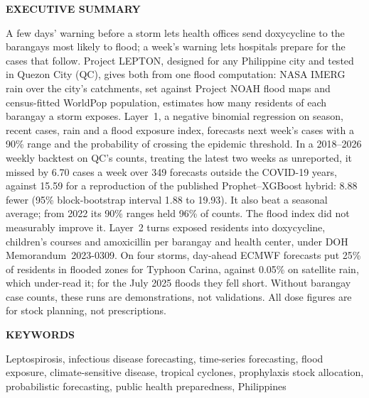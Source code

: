 \begin{leptonsummary}
{\color{leptonnavy}\large\bfseries EXECUTIVE SUMMARY\par}
\vspace{1mm}
A few days' warning before a storm lets health offices send doxycycline to the barangays most
likely to flood; a week's warning lets hospitals prepare for the cases that follow. Project
LEPTON, designed for any Philippine city and tested in Quezon City (QC), gives both from one
flood computation: NASA IMERG rain over the city's catchments, set against Project NOAH flood
maps and census-fitted WorldPop population, estimates how many residents of each barangay a
storm exposes. Layer~1, a negative binomial regression on season, recent cases, rain and a flood
exposure index, forecasts next week's cases with a 90\% range and the probability of crossing
the epidemic threshold. In a 2018--2026 weekly backtest on QC's counts, treating the latest two
weeks as unreported, it missed by 6.70 cases a week over 349 forecasts outside the COVID-19
years, against 15.59 for a reproduction of the published Prophet--XGBoost hybrid: 8.88 fewer
(95\% block-bootstrap interval 1.88 to 19.93). It also beat a seasonal average; from 2022 its
90\% ranges held 96\% of counts. The
flood index did not measurably improve it. Layer~2 turns exposed residents into doxycycline,
children's courses and amoxicillin per barangay and health center, under DOH
Memorandum~\mbox{2023-0309}. On four storms, day-ahead ECMWF forecasts put 25\% of residents in
flooded zones for Typhoon Carina, against 0.05\% on satellite rain, which under-read it; for the
July 2025 floods they fell short. Without barangay case counts, these runs are demonstrations,
not validations. All dose figures are for stock planning, not prescriptions.

\vspace{1mm}
{\color{leptonnavy}\large\bfseries KEYWORDS\par}
\vspace{1mm}
Leptospirosis, infectious disease forecasting, time-series forecasting, flood exposure,
climate-sensitive disease, tropical cyclones, prophylaxis stock allocation, probabilistic
forecasting, public health preparedness, Philippines
\end{leptonsummary}
